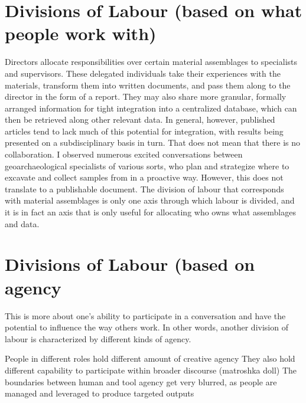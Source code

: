 \documentclass{article}
\begin{document}
\section{Divisions of Labour (based on what people work with)}
Directors allocate responsibilities over certain material assemblages to specialists and supervisors.
These delegated individuals take their experiences with the materials, transform them into written documents, and pass them along to the director in the form of a report.
They may also share more granular, formally arranged information for tight integration into a centralized database, which can then be retrieved along other relevant data.
In general, however, published articles tend to lack much of this potential for integration, with results being presented on a subdisciplinary basis in turn.
That does not mean that there is no collaboration.
I observed numerous excited conversations between geoarchaeological specialists of various sorts, who plan and strategize where to excavate and collect samples from in a proactive way.
However, this does not translate to a publishable document.
The division of labour that corresponds with material assemblages is only one axis through which labour is divided, and it is in fact an axis that is only useful for allocating who owns what assemblages and data.

\section{Divisions of Labour (based on agency}
This is more about one's ability to participate in a conversation and have the potential to influence the way others work.
In other words, another division of labour is characterized by different kinds of agency.

People in different roles hold different amount of creative agency
They also hold different capability to participate within broader discourse (matroshka doll)
The boundaries between human and tool agency get very blurred, as people are managed and leveraged to produce targeted outputs
\end{document}
